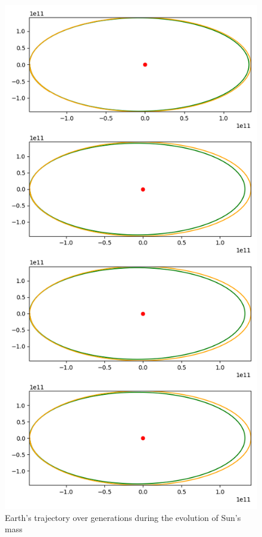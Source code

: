 \begin{figure}
    \center
    \includegraphics[scale=.3]{img/sun_mass.png}
    \caption{Earth's trajectory over generations during the evolution of Sun's
        mass}
    \label{sun_mass_2}
\end{figure}

